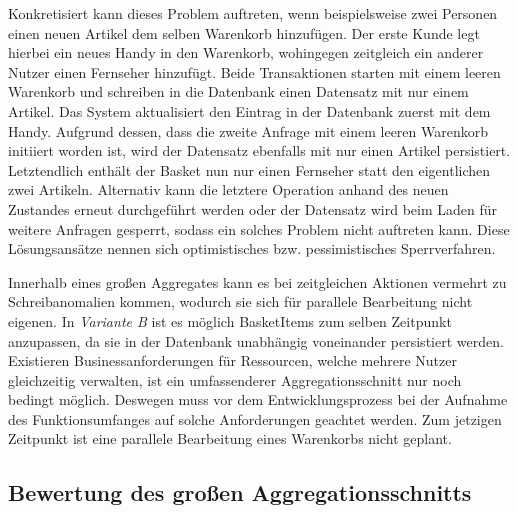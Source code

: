 Konkretisiert kann dieses Problem auftreten, wenn beispielsweise zwei Personen einen neuen Artikel dem selben Warenkorb hinzufügen. Der erste Kunde legt hierbei ein neues Handy in den Warenkorb, wohingegen zeitgleich ein anderer Nutzer einen Fernseher hinzufügt. Beide Transaktionen starten mit einem leeren Warenkorb und schreiben in die Datenbank einen Datensatz mit nur einem Artikel. Das System aktualisiert den Eintrag in der Datenbank zuerst mit dem Handy. Aufgrund dessen, dass die zweite Anfrage mit einem leeren Warenkorb initiiert worden ist, wird der Datensatz ebenfalls mit nur einen Artikel persistiert. Letztendlich enthält der Basket nun nur einen Fernseher statt den eigentlichen zwei Artikeln. Alternativ kann die letztere Operation anhand des neuen Zustandes erneut durchgeführt werden oder der Datensatz wird beim Laden für weitere Anfragen gesperrt, sodass ein solches Problem nicht auftreten kann. Diese Lösungsansätze nennen sich optimistisches bzw. pessimistisches Sperrverfahren. 

Innerhalb eines großen Aggregates kann es bei zeitgleichen Aktionen vermehrt zu Schreibanomalien kommen, wodurch sie sich für parallele Bearbeitung nicht eigenen. In \emph{Variante B} ist es möglich BasketItems zum selben Zeitpunkt anzupassen, da sie in der Datenbank unabhängig voneinander persistiert werden. Existieren Businessanforderungen für Ressourcen, welche mehrere Nutzer gleichzeitig verwalten, ist ein umfassenderer Aggregationsschnitt nur noch bedingt möglich. Deswegen muss vor dem Entwicklungsprozess bei der Aufnahme des Funktionsumfanges auf solche Anforderungen geachtet werden. Zum jetzigen Zeitpunkt ist eine parallele Bearbeitung eines Warenkorbs nicht geplant.

\subsection{Bewertung des großen Aggregationsschnitts}

